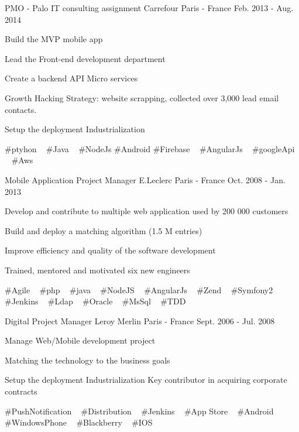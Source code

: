 \begin{cventries}
  \cventry
    {PMO - Palo IT consulting assignment} %
    {Carrefour} %
    {Paris - France} %
    {Feb. 2013 - Aug. 2014} %
    {
      \begin{cvitems} %
        \item {Build the MVP mobile app}
        \item {Lead the Front-end development department}
        \item {Create a backend API Micro services}
        \item {Growth Hacking Strategy: website scrapping, collected over 3,000 lead email contacts.}
        \item {Setup the deployment Industrialization}
      \end{cvitems}
    }
    {
      \#ptyhon ~
      \#Java ~
      \#NodeJs
      \#Android
      \#Firebase ~
      \#AngularJs ~
      \#googleApi ~
      \#Aws ~
    }

  \cventry
    {Mobile Application Project Manager} %
    {E.Leclerc} %
    {Paris - France} %
    {Oct. 2008 - Jan. 2013} %
    {
      \begin{cvitems} %
        \item {Develop and contribute to multiple web application used by 200 000 customers}
        \item {Build and deploy a matching algorithm (1.5 M entries)}
        \item {Improve efficiency and quality of the software development}
        \item {Trained, mentored and motivated six new engineers}
      \end{cvitems}
    }
    {
      \#Agile ~
      \#php ~
      \#java ~
      \#NodeJS ~
      \#AngularJs ~
      \#Zend ~
      \#Symfony2 ~
      \#Jenkins ~
      \#Ldap ~
      \#Oracle ~
      \#MsSql ~
      \#TDD
    }

  \cventry
    {Digital Project Manager} %
    {Leroy Merlin} %
    {Paris - France} %
    {Sept. 2006 - Jul. 2008} %
    {
      \begin{cvitems} %
        \item {Manage Web/Mobile development project}
        \item {Matching the technology to the business goals}
        \item {Setup the deployment Industrialization Key contributor in acquiring corporate contracts}
      \end{cvitems}
    }
    {
      \#PushNotification ~
      \#Distribution ~
      \#Jenkins ~
      \#App Store ~
      \#Android ~
      \#WindowsPhone ~
      \#Blackberry ~
      \#IOS
    }

\end{cventries}

